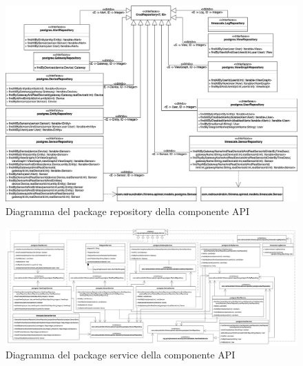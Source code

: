 		\begin{landscape}
		\begin{figure}[H]
			\centering
			\includegraphics[scale=0.525]{res/images/API/RepositoryPackage.png}
			\caption{Diagramma del package repository della componente API}
			\label{Diagramma 15}
		\end{figure}
		\begin{figure}[H]
			\centering
			\includegraphics[scale=0.300]{res/images/API/ServicePackage.png}
			\caption{Diagramma del package service della componente API}
			\label{Diagramma 16}
		\end{figure}
		

\end{landscape}
